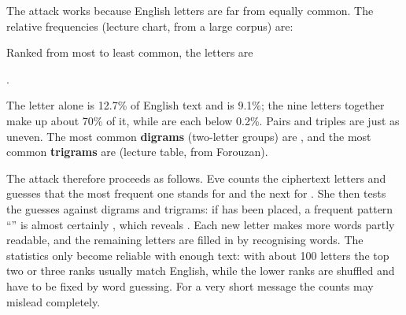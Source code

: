 The attack works because English letters are far from equally common. The relative frequencies (lecture chart, from a large corpus) are:
\begin{center}
\end{center}
Ranked from most to least common, the letters are
\begin{center}
.
\end{center}
The letter  alone is 12.7\% of English text and  is 9.1\%; the nine letters  together make up about 70\% of it, while  are each below 0.2\%. Pairs and triples are just as uneven. The most common \textbf{digrams} (two-letter groups) are , and the most common \textbf{trigrams} are  (lecture table, from Forouzan).

The attack therefore proceeds as follows. Eve counts the ciphertext letters and guesses that the most frequent one stands for  and the next for . She then tests the guesses against digrams and trigrams: if  has been placed, a frequent pattern ``'' is almost certainly , which reveals . Each new letter makes more words partly readable, and the remaining letters are filled in by recognising words. The statistics only become reliable with enough text: with about 100 letters the top two or three ranks usually match English, while the lower ranks are shuffled and have to be fixed by word guessing. For a very short message the counts may mislead completely.

